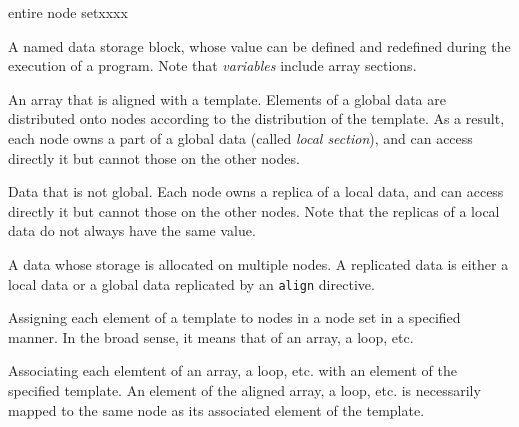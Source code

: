 \begin{namelist}{entire node setxxxx}


 A named data storage block, whose value can be defined and redefined
 during the execution of a program. Note that {\it variables} include
 array sections.


 An array that is aligned with a template. Elements of a global data are
 distributed onto nodes according to the distribution of the
 template. As a result, each node owns a part of a global data (called
 {\it local section}), and can access directly it but cannot those on
 the other nodes.



 Data that is not global. Each node owns a replica of a local data,
 and can access directly it but cannot those on the other nodes. Note
 that the replicas of a local data do not always have the same value.



 A data whose storage is allocated on multiple nodes. A replicated data
 is either a local data or a global data replicated by an {\tt align}
 directive.


 Assigning each element of a template to nodes in a node set in a
 specified manner. In the broad sense, it means that of an array, a
 loop, etc.



 Associating each elemtent of an array, a loop, etc. with an element of
 the specified template. An element of the aligned array, a loop,
 etc. is necessarily mapped to the same node as its associated element
 of the template.



\end{namelist}

